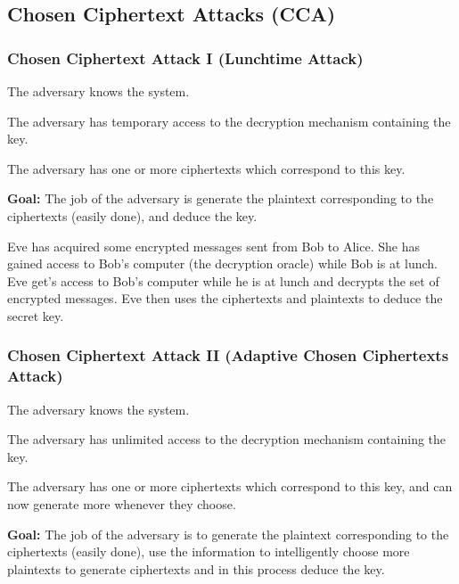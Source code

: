 \subsection{Chosen Ciphertext Attacks (CCA)}



\subsubsection*{Chosen Ciphertext Attack I (Lunchtime Attack)}

\begin{asu}
\label{am:a1}
    
The adversary knows the system.
\end{asu}

\begin{asu}
The adversary has temporary access to the decryption mechanism containing the key.
\end{asu}

\begin{asu}
The adversary has one or more ciphertexts which correspond to this key. 
\end{asu}


\textbf{Goal:} The job of the adversary is generate the plaintext corresponding to the ciphertexts (easily done), and deduce the key.

\begin{exmp}

Eve has acquired some  encrypted messages sent from Bob to Alice.
She has gained access to Bob’s computer (the decryption oracle) while Bob is at lunch.
Eve get’s access to Bob’s computer while he is at lunch and decrypts the set of encrypted messages.
Eve then uses the ciphertexts and plaintexts to deduce the secret key.
\end{exmp}

\subsubsection*{Chosen Ciphertext Attack II (Adaptive Chosen Ciphertexts Attack)}

\begin{asu}
The adversary knows the system.
\end{asu}


\begin{asu}
The adversary has unlimited access to the decryption mechanism containing the key.
\end{asu}

\begin{asu}
The adversary has one or more ciphertexts which correspond to this key, and can now generate more whenever they choose.
\end{asu}


\textbf{Goal:} The job of the adversary is to generate the plaintext corresponding to the ciphertexts (easily done), use the information to intelligently choose more plaintexts to generate ciphertexts and in this process deduce the key.
